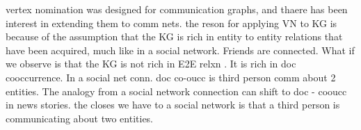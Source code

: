 \documentclass[paper=a4,fontsize=11pt]{scrartcl}
\numberwithin{equation}{section}    %
\numberwithin{figure}{section}      %
\numberwithin{table}{section}       %
\begin{document}
\begin{snugshade}
  {vertex nomination was designed for communication graphs, and thaere has
been interest in extending them to comm nets. the reson for applying VN to KG is
because of the assumption that the KG is rich in entity to entity relations that
have been acquired, much like in a social network. Friends are connected. What
if we observe is that the KG is not rich in E2E relxn . It is rich in doc
cooccurrence. In a social net conn. doc co-oucc is third person comm about 2
entities. The analogy from a social network connection can shift to doc - cooucc
in news stories. the closes we have to a social network is that a third person
is communicating about two entities.}
\end{snugshade}


\end{document}
